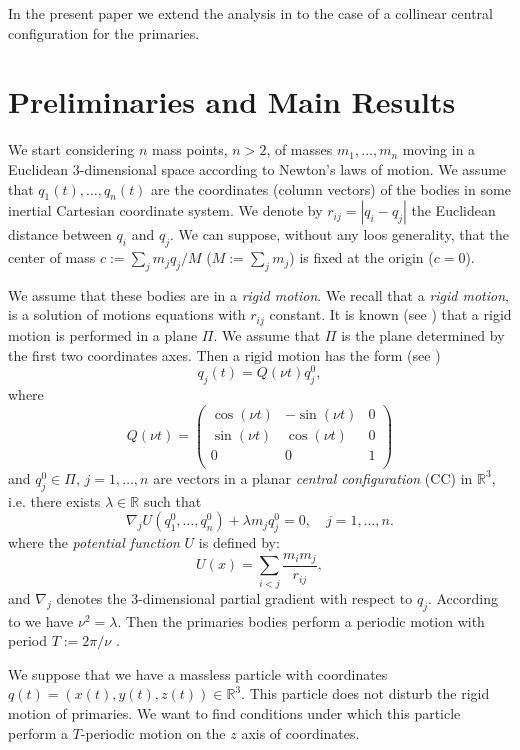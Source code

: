 \documentclass[twoside]{article}
\theoremstyle{remark}
\newcommand{\rr}{\mathbb{R}}
\begin{document}
In the present paper we extend the analysis in \cite{zhao2015nonplanar} to the case of a collinear central configuration for the primaries.





\section{Preliminaries and Main Results}

We start considering $n$  mass points, $n>2$, of masses $m_1,\ldots,m_n$ moving in a Euclidean 3-dimensional space according to Newton's laws of motion. We assume that $q_1(t),\ldots,q_n(t)$ are the coordinates (column vectors) of the bodies in some inertial Cartesian coordinate system. We denote by $r_{ij}=|q_i-q_j|$  the  Euclidean distance between $q_i$ and $q_j$. We can suppose, without any loos generality, that the center of mass   $c:=\sum_jm_jq_j/M$ ($M:=\sum_j m_j$) is fixed at the origin ($c=0$).

We assume that these bodies are in a \emph{rigid motion}. We recall that a \emph{rigid  motion}, is a solution of motions equations with $r_{ij}$ constant.  It is known (see \cite{ AurelWintner272}) that a rigid motion is performed in a plane $\Pi$. We assume that $\Pi$ is the plane determined by the first two coordinates axes. Then a rigid motion has the form (see \cite{JaumeLlibre276})
\[q_j(t)=Q(\nu t)q^0_j,\]
where
\[
 Q(\nu t)=\begin{pmatrix}
           \cos(\nu t) & -\sin(\nu t) & 0\\
           \sin(\nu t) & \cos(\nu t) & 0\\
           0            &     0     &  1\\
          \end{pmatrix}
\]
and $q^0_j\in\Pi$, $j=1,\ldots,n$ are vectors in a planar \emph{central configuration} (CC) in $\rr^3$, i.e. there exists $\lambda\in\rr$ such that
\[ \nabla_jU(q^0_1,\ldots,q^0_n)+\lambda m_jq^0_j=0,\quad j=1,\ldots,n.\]
where the \emph{potential function} $U$ is defined by:
\begin{equation}\label{eq:potencial}
 U(x)=\sum_{i<j}\frac{m_im_j}{r_{ij}},
\end{equation}
and $\nabla_j$ denotes the $3$-dimensional partial gradient with respect to $q_j$.
According to \cite[Eq. (2.16)]{JaumeLlibre276} we have $\nu^2=\lambda$. Then the primaries bodies perform a periodic motion with period $T:=2\pi/\nu$ .

We suppose that we have a massless particle with coordinates $q(t)=(x(t),y(t),z(t))\in\rr^3$. This particle does not disturb the rigid motion of  primaries.  We want to find conditions under which this particle perform a $T$-periodic motion on the $z$ axis of coordinates.
\end{document}
